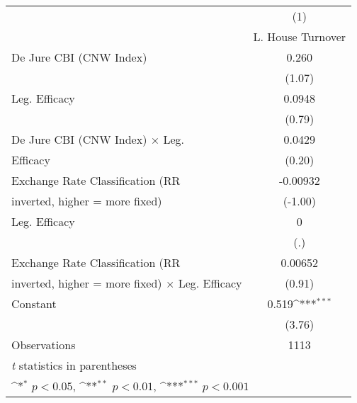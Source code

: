 \begin{table}[htbp]\centering
\def\sym#1{\ifmmode^{#1}\else\(^{#1}\)\fi}
\caption{\label{llpFEDJ}}
\begin{tabular}{l*{1}{c}}
\toprule
                                        &\multicolumn{1}{c}{(1)}\\
                                        &\multicolumn{1}{c}{L. House Turnover}\\
\midrule
De Jure CBI (CNW Index)                 &    0.260         \\
                                        &   (1.07)         \\
\addlinespace
Leg. Efficacy                           &   0.0948         \\
                                        &   (0.79)         \\
\addlinespace
De Jure CBI (CNW Index) $\times$ Leg.   &   0.0429         \\
Efficacy                                &   (0.20)         \\
\addlinespace
Exchange Rate Classification (RR        & -0.00932         \\
inverted, higher = more fixed)          &  (-1.00)         \\
\addlinespace
Leg. Efficacy                           &        0         \\
                                        &      (.)         \\
\addlinespace
Exchange Rate Classification (RR        &  0.00652         \\
inverted, higher = more fixed) $\times$ Leg. Efficacy&   (0.91)         \\
\addlinespace
Constant                                &    0.519\sym{***}\\
                                        &   (3.76)         \\
\midrule
Observations                            &     1113         \\
\bottomrule
\multicolumn{2}{l}{\footnotesize \textit{t} statistics in parentheses}\\
\multicolumn{2}{l}{\footnotesize \sym{*} \(p<0.05\), \sym{**} \(p<0.01\), \sym{***} \(p<0.001\)}\\
\end{tabular}
\end{table}
